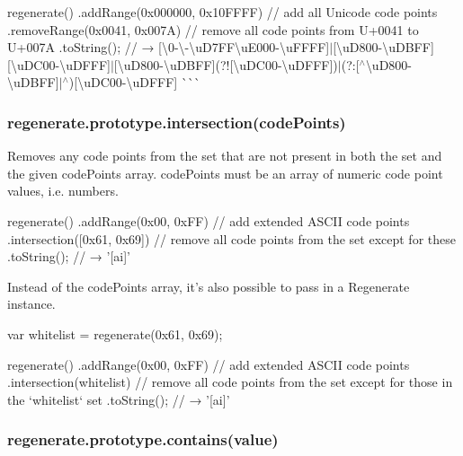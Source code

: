 regenerate() .add\+Range(0x000000, 0x10\+F\+F\+F\+F) // add all Unicode code points .remove\+Range(0x0041, 0x007\+A) // remove all code points from U+0041 to U+007A .to\+String(); // → \textquotesingle{}\mbox{[}\textbackslash{}0-\/\textbackslash{}-\/\textbackslash{}u\+D7\+FF\textbackslash{}u\+E000-\/\textbackslash{}u\+F\+F\+FF\mbox{]}$\vert$\mbox{[}\textbackslash{}u\+D800-\/\textbackslash{}u\+D\+B\+FF\mbox{]}\mbox{[}\textbackslash{}u\+D\+C00-\/\textbackslash{}u\+D\+F\+FF\mbox{]}$\vert$\mbox{[}\textbackslash{}u\+D800-\/\textbackslash{}u\+D\+B\+FF\mbox{]}(?!\mbox{[}\textbackslash{}u\+D\+C00-\/\textbackslash{}u\+D\+F\+FF\mbox{]})$\vert$(?\+:\mbox{[}$^\wedge$\textbackslash{}u\+D800-\/\textbackslash{}u\+D\+B\+FF\mbox{]}$\vert$$^\wedge$)\mbox{[}\textbackslash{}u\+D\+C00-\/\textbackslash{}u\+D\+F\+FF\mbox{]}\textquotesingle{} \`{}\`{}\`{}

\subsubsection*{{\ttfamily regenerate.\+prototype.\+intersection(code\+Points)}}

Removes any code points from the set that are not present in both the set and the given {\ttfamily code\+Points} array. {\ttfamily code\+Points} must be an array of numeric code point values, i.\+e. numbers.


\begin{DoxyCode}
regenerate()
  .addRange(0x00, 0xFF) // add extended ASCII code points
  .intersection([0x61, 0x69]) // remove all code points from the set except for these
  .toString();
// → '[ai]'
\end{DoxyCode}


Instead of the {\ttfamily code\+Points} array, it’s also possible to pass in a Regenerate instance.


\begin{DoxyCode}
var whitelist = regenerate(0x61, 0x69);

regenerate()
  .addRange(0x00, 0xFF) // add extended ASCII code points
  .intersection(whitelist) // remove all code points from the set except for those in the `whitelist` set
  .toString();
// → '[ai]'
\end{DoxyCode}


\subsubsection*{{\ttfamily regenerate.\+prototype.\+contains(value)}}

